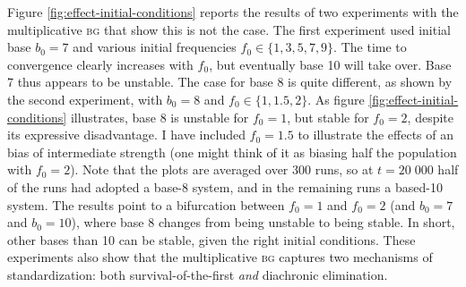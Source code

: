 \documentclass{../src/bcthesispart}
\begin{document}
Figure \ref{fig:effect-initial-conditions} reports the results of two experiments with the multiplicative \textsc{bg} that show this is not the case.
The first experiment used initial base $b_0 = 7$ and various initial frequencies $f_0 \in \{ 1, 3, 5, 7, 9\}$.
The time to convergence clearly increases with $f_0$, but eventually base 10 will take over.
Base 7 thus appears to be unstable.
The case for base 8 is quite different, as shown by the second experiment, with $b_0 = 8$ and $f_0 \in \{1, 1.5, 2\}$. 
As figure \ref{fig:effect-initial-conditions} illustrates, base 8 is unstable for $f_0=1$, but stable for $f_0=2$, despite its expressive disadvantage.
I have included $f_0 = 1.5$ to illustrate the effects of an bias of intermediate strength (one might think of it as biasing half the population with $f_0=2$).
Note that the plots are averaged over 300 runs, so at $t=20\; 000$ half of the runs had adopted a base-8 system, and in the remaining runs a based-10 system.
The results point to a bifurcation between $f_0=1$ and $f_0=2$ (and $b_0 = 7$ and $b_0 = 10$), where base $8$ changes from being unstable to being stable.
In short, other bases than 10 can be stable, given the right initial conditions.
These experiments also show that the multiplicative \textsc{bg} captures two mechanisms of standardization: both survival-of-the-first \emph{and} diachronic elimination.
\end{document}
